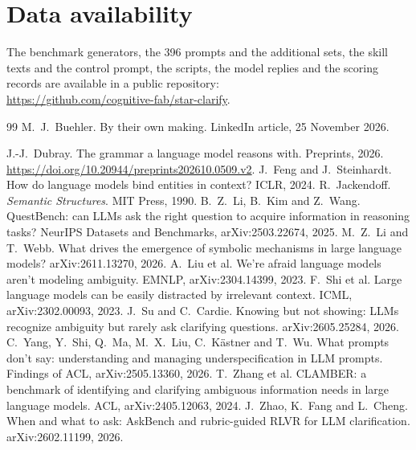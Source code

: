 \documentclass[11pt,a4paper]{article}
\begin{document}
\section*{Data availability}
The benchmark generators, the 396 prompts and the additional sets, the
skill texts and the control prompt, the scripts, the model replies and the
scoring records are available in a public repository:\\
\url{https://github.com/cognitive-fab/star-clarify}.

\begin{thebibliography}{99}\small
{} M.~J.~Buehler. By their own making.
LinkedIn article, 25 November 2026.

 J.-J.~Dubray. The grammar a language model
reasons with. Preprints, 2026.
\url{https://doi.org/10.20944/preprints202610.0509.v2}.
 J.~Feng and J.~Steinhardt. How do language models
bind entities in context? ICLR, 2024.
 R.~Jackendoff. \emph{Semantic
Structures}. MIT Press, 1990.
 B.~Z.~Li, B.~Kim and Z.~Wang. QuestBench: can
LLMs ask the right question to acquire information in reasoning tasks?
NeurIPS Datasets and Benchmarks, arXiv:2503.22674, 2025.
 M.~Z.~Li and T.~Webb. What drives the emergence of
symbolic mechanisms in large language models? arXiv:2611.13270, 2026.
 A.~Liu et al. We're afraid language models aren't
modeling ambiguity. EMNLP, arXiv:2304.14399, 2023.
 F.~Shi et al. Large language models can be
easily distracted by irrelevant context. ICML, arXiv:2302.00093, 2023.
 J.~Su and C.~Cardie. Knowing but not showing: LLMs
recognize ambiguity but rarely ask clarifying questions. arXiv:2605.25284,
2026.
 C.~Yang, Y.~Shi, Q.~Ma, M.~X.~Liu, C.~K\"astner
and T.~Wu. What prompts don't say: understanding and managing
underspecification in LLM prompts. Findings of ACL, arXiv:2505.13360, 2026.
 T.~Zhang et al. CLAMBER: a benchmark of
identifying and clarifying ambiguous information needs in large language
models. ACL, arXiv:2405.12063, 2024.
 J.~Zhao, K.~Fang and L.~Cheng. When and what to
ask: AskBench and rubric-guided RLVR for LLM clarification.
arXiv:2602.11199, 2026.
\end{thebibliography}
\end{document}
